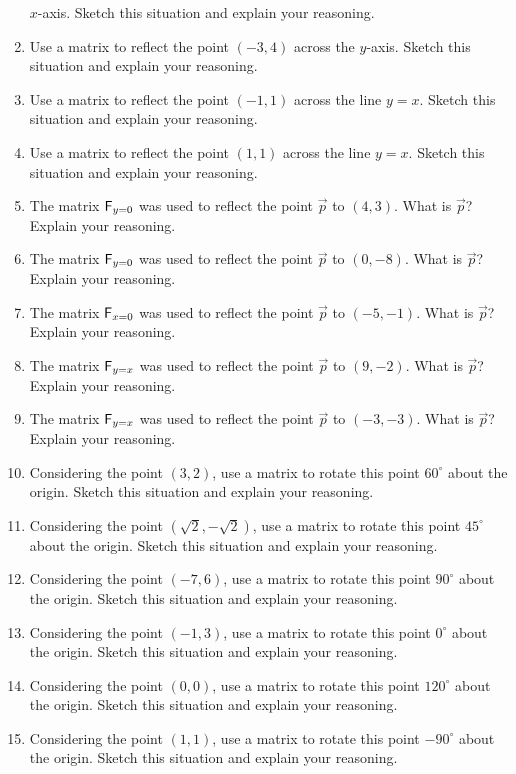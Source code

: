 \begin{enumerate}
  $x$-axis. Sketch this situation and explain your reasoning.
\item Use a matrix to reflect the point $(-3,4)$ across the
  $y$-axis. Sketch this situation and explain your reasoning.
\item Use a matrix to reflect the point $(-1,1)$ across the line
  $y=x$. Sketch this situation
  and explain your reasoning.
\item Use a matrix to reflect the point $(1,1)$ across the line
  $y=x$. Sketch this situation
  and explain your reasoning.
\item The matrix $\mathsf{F}_{y=0}$ was used to reflect the point $\vec{p}$
  to $(4,3)$.  What is $\vec{p}$? Explain your reasoning.
\item The matrix $\mathsf{F}_{y=0}$ was used to reflect the point $\vec{p}$
  to $(0,-8)$.  What is $\vec{p}$? Explain your reasoning.
\item The matrix $\mathsf{F}_{x=0}$ was used to reflect the point $\vec{p}$
  to $(-5,-1)$.  What is $\vec{p}$? Explain your reasoning.
\item The matrix $\mathsf{F}_{y=x}$ was used to reflect the point $\vec{p}$
  to $(9,-2)$.  What is $\vec{p}$? Explain your reasoning.
\item The matrix $\mathsf{F}_{y=x}$ was used to reflect the point $\vec{p}$
  to $(-3,-3)$.  What is $\vec{p}$? Explain your reasoning.
\item Considering the point $(3,2)$, use a matrix to rotate this point
  $60^\circ$ about the origin.  Sketch this situation and explain your
  reasoning.  
\item Considering the point $(\sqrt{2},-\sqrt{2})$, use a matrix to
  rotate this point $45^\circ$ about the origin.  Sketch this
  situation and explain your reasoning.
\item Considering the point $(-7,6)$, use a matrix to rotate this point
  $90^\circ$ about the origin.  Sketch this situation and explain your
  reasoning.  
\item Considering the point $(-1,3)$, use a matrix to rotate this point
  $0^\circ$ about the origin.  Sketch this situation and explain your
  reasoning.  
\item Considering the point $(0,0)$, use a matrix to rotate this point
  $120^\circ$ about the origin.  Sketch this situation and explain your
  reasoning.  
\item Considering the point $(1,1)$, use a matrix to rotate this point
  $-90^\circ$ about the origin.  Sketch this situation and explain your
  reasoning.  

\end{enumerate}
